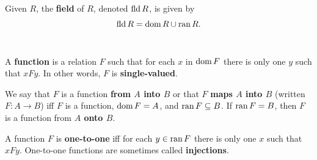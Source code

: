 \documentclass{report}
\begin{document}
\begin{axiom}


\end{axiom}

\section{}%

Given  $R$, the \textbf{field} of $R$, denoted $\mathop{\text{fld}}{R}$,
  is given by $$\mathop{\text{fld}}{R} = \mathop{\text{dom}}{R} \cup \mathop{\text{ran}}{R}.$$

\begin{definition}


\end{definition}

\section{}%

A \textbf{function} is a relation $F$ such that for each $x$ in $\mathop{\text{dom}}{F}$ there
  is only one $y$ such that $xFy$.
In other words, $F$ is \textbf{single-valued}.

We say that $F$ is a function \textbf{from $A$ into $B$} or that $F$
  \textbf{maps $A$ into $B$} (written $F \colon A \rightarrow B$) iff $F$ is a
  function, $\mathop{\text{dom}}{F} = A$, and $\mathop{\text{ran}}{F} \subseteq B$.
If $\mathop{\text{ran}}{F} = B$, then $F$ is a function from \textbf{$A$ onto $B$}.

A function $F$ is \textbf{one-to-one} iff for each $y \in \mathop{\text{ran}}{F}$ there is only
  one $x$ such that $xFy$.
One-to-one functions are sometimes called \textbf{injections}.

\begin{definition}

  \statementpadding




\end{definition}

\section{}%
\end{document}
